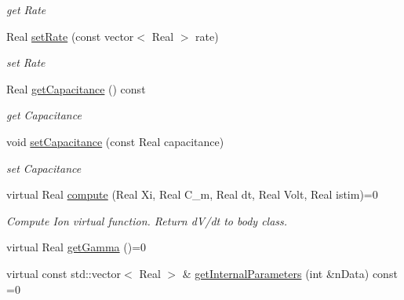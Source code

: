 \begin{DoxyCompactItemize}
\begin{DoxyCompactList}\small\item\em get Rate \item\end{DoxyCompactList}\item 
\hypertarget{classvoom_1_1_ionic_material_ab77d8356cf923c8af2a630a4d678300e}{
Real \hyperlink{classvoom_1_1_ionic_material_ab77d8356cf923c8af2a630a4d678300e}{setRate} (const vector$<$ Real $>$ rate)}
\label{classvoom_1_1_ionic_material_ab77d8356cf923c8af2a630a4d678300e}

\begin{DoxyCompactList}\small\item\em set Rate \item\end{DoxyCompactList}\item 
\hypertarget{classvoom_1_1_ionic_material_a0984247d72470a91dd6813cbadd9e9b9}{
Real \hyperlink{classvoom_1_1_ionic_material_a0984247d72470a91dd6813cbadd9e9b9}{getCapacitance} () const }
\label{classvoom_1_1_ionic_material_a0984247d72470a91dd6813cbadd9e9b9}

\begin{DoxyCompactList}\small\item\em get Capacitance \item\end{DoxyCompactList}\item 
\hypertarget{classvoom_1_1_ionic_material_ab3916e8bef510385d019873d6c40b74c}{
void \hyperlink{classvoom_1_1_ionic_material_ab3916e8bef510385d019873d6c40b74c}{setCapacitance} (const Real capacitance)}
\label{classvoom_1_1_ionic_material_ab3916e8bef510385d019873d6c40b74c}

\begin{DoxyCompactList}\small\item\em set Capacitance \item\end{DoxyCompactList}\item 
\hypertarget{classvoom_1_1_ionic_material_a1b95cf90af115374b428f2e5ece571cb}{
virtual Real \hyperlink{classvoom_1_1_ionic_material_a1b95cf90af115374b428f2e5ece571cb}{compute} (Real Xi, Real C\_\-m, Real dt, Real Volt, Real istim)=0}
\label{classvoom_1_1_ionic_material_a1b95cf90af115374b428f2e5ece571cb}

\begin{DoxyCompactList}\small\item\em Compute Ion virtual function. Return dV/dt to body class. \item\end{DoxyCompactList}\item 
virtual Real \hyperlink{classvoom_1_1_ionic_material_a98f1fa5bc5fa9ff6abfcd302111f8eac}{getGamma} ()=0
\item 
\hypertarget{classvoom_1_1_ionic_material_adb8811b4155603d5704199f49930c65d}{
virtual const std::vector$<$ Real $>$ \& \hyperlink{classvoom_1_1_ionic_material_adb8811b4155603d5704199f49930c65d}{getInternalParameters} (int \&nData) const =0}
\label{classvoom_1_1_ionic_material_adb8811b4155603d5704199f49930c65d}


\end{DoxyCompactItemize}
